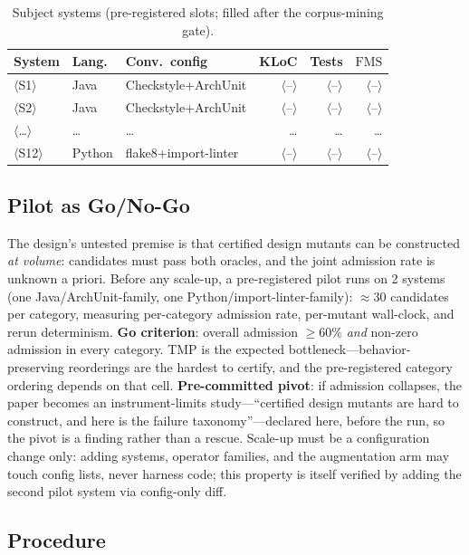 \documentclass[conference]{IEEEtran}
\newcommand{\ph}[1]{\colorbox{yellow!35}{\small$\langle$\textsf{#1}$\rangle$}}
\newcommand{\fms}{\mathrm{FMS}}
\begin{document}
\begin{table}[t]
\centering
\caption{Subject systems (pre-registered slots; filled after the corpus-mining gate).}
\label{tab:subjects}
\begin{tabular}{@{}lllrrr@{}}
\toprule
System & Lang. & Conv.\ config & KLoC & Tests & $\fms$ \\
\midrule
\ph{S1} & Java & Checkstyle+ArchUnit & \ph{--} & \ph{--} & \ph{--} \\
\ph{S2} & Java & Checkstyle+ArchUnit & \ph{--} & \ph{--} & \ph{--} \\
\ph{\dots} & \dots & \dots & \dots & \dots & \dots \\
\ph{S12} & Python & flake8+import-linter & \ph{--} & \ph{--} & \ph{--} \\
\bottomrule
\end{tabular}
\end{table}

\subsection{Pilot as Go/No-Go}\label{sec:pilot}

The design's untested premise is that certified design mutants can be constructed \emph{at volume}: candidates must pass both oracles, and the joint admission rate is unknown a priori. Before any scale-up, a pre-registered pilot runs on 2 systems (one Java/ArchUnit-family, one Python/import-linter-family): $\approx 30$ candidates per category, measuring per-category admission rate, per-mutant wall-clock, and rerun determinism. \textbf{Go criterion}: overall admission $\geq 60\%$ \emph{and} non-zero admission in every category. TMP is the expected bottleneck---behavior-preserving reorderings are the hardest to certify, and the pre-registered category ordering depends on that cell. \textbf{Pre-committed pivot}: if admission collapses, the paper becomes an instrument-limits study---``certified design mutants are hard to construct, and here is the failure taxonomy''---declared here, before the run, so the pivot is a finding rather than a rescue. Scale-up must be a configuration change only: adding systems, operator families, and the augmentation arm may touch config lists, never harness code; this property is itself verified by adding the second pilot system via config-only diff.

\subsection{Procedure}\label{sec:procedure}
\end{document}
